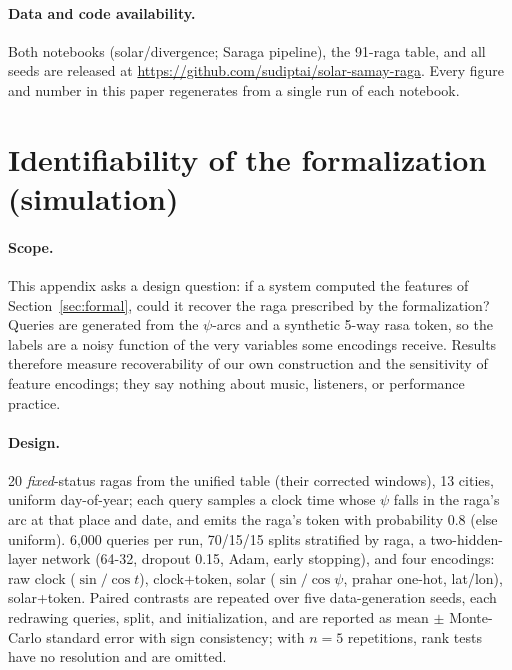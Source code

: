 \documentclass[11pt]{article}
\begin{document}
\paragraph{Data and code availability.}
Both notebooks (solar/divergence; Saraga pipeline), the 91-raga table, and
all seeds are released at
\url{https://github.com/sudiptai/solar-samay-raga}. Every figure and number
in this paper regenerates from a single run of each notebook.

\appendix
\section{Identifiability of the formalization (simulation)}\label{app:ident}

\paragraph{Scope.}
This appendix asks a design question: if a system computed the features of
Section~\ref{sec:formal}, could it recover the raga prescribed by the
formalization? Queries are generated from the $\psi$-arcs and a synthetic
5-way rasa token, so the labels are a noisy function of the very variables
some encodings receive. Results therefore measure recoverability of our own
construction and the sensitivity of feature encodings; they say nothing
about music, listeners, or performance practice.

\paragraph{Design.}
20 \emph{fixed}-status ragas from the unified table (their corrected
windows), 13 cities, uniform day-of-year; each query samples a clock time
whose $\psi$ falls in the raga's arc at that place and date, and emits the
raga's token with probability 0.8 (else uniform). 6{,}000 queries per run,
70/15/15 splits stratified by raga, a two-hidden-layer network (64-32,
dropout 0.15, Adam, early stopping), and four encodings: raw clock
($\sin/\cos t$), clock+token, solar ($\sin/\cos\psi$, prahar one-hot,
lat/lon), solar+token. Paired contrasts are repeated over five
data-generation seeds, each redrawing queries, split, and initialization,
and are reported as mean $\pm$ Monte-Carlo standard error with sign
consistency; with $n = 5$ repetitions, rank tests have no resolution and are
omitted.
\end{document}
